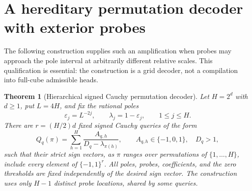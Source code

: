 \documentclass[11pt]{article}
\newtheorem{theorem}{Theorem}
\begin{document}
\section{A hereditary permutation decoder with exterior probes}

The following construction supplies such an amplification when probes
may approach the pole interval at arbitrarily different relative
scales. This qualification is essential: the construction is a grid
decoder, not a compilation into full-cube admissible heads.

\begin{theorem}[Hierarchical signed Cauchy permutation decoder]
Let $H=2^d$ with $d\geq1$, put $L=4H$, and fix the rational poles
\[
 \varepsilon_j=L^{-2j},\qquad \lambda_j=1-\varepsilon_j,
 \qquad 1\leq j\leq H.
\]
There are $r=(H/2)d$ fixed signed Cauchy queries of the form
\[
 Q_q(\pi)=\sum_{h=1}^H\frac{A_{q,h}}{D_q-\lambda_{\pi(h)}},
 \qquad A_{q,h}\in\{-1,0,1\},\quad D_q>1,
\]
such that their strict sign vectors, as $\pi$ ranges over permutations
of $\{1,\ldots,H\}$, include every element of $\{-1,1\}^r$.
All poles, probes, coefficients, and the zero thresholds are fixed
independently of the desired sign vector. The construction uses only
$H-1$ distinct probe locations, shared by some queries.
\end{theorem}
\end{document}
